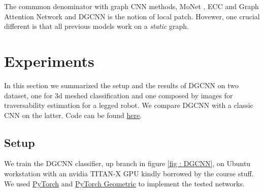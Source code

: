\documentclass[twocolumn,showpacs,
  nofootinbib,aps,superscriptaddress,
  eqsecnum,prd,notitlepage,showkeys,10pt]{revtex4-1}
\begin{document}
The commmon denominator with graph CNN methods, MoNet \cite{monet}, ECC \cite{ecc} and Graph Attention Network \cite{gat} and DGCNN is the notion of local patch. Hovewer, one crucial different is that all previous models work on a \emph{static} graph.


\section{Experiments}
In this section we summarized the setup and the results of DGCNN on two dataset, one for 3d meshed classification and one composed by images for traversability estimation for a legged robot. We compare DGCNN with a classic CNN on the latter. Code can be found \href{https://github.com/FrancescoSaverioZuppichini/GDL-project}{here}.
\subsection{Setup}
We train the DGCNN classifier, up branch in figure \ref{fig : DGCNN}, on Ubuntu workstation with an nvidia TITAN-X GPU kindly borrowed by the course stuff. We used \href{https://pytorch.org/}{PyTorch} and \href{https://rusty1s.github.io/pytorch_geometric/build/html/index.html}{PyTorch Geometric} to implement the tested networks. 
\end{document}
